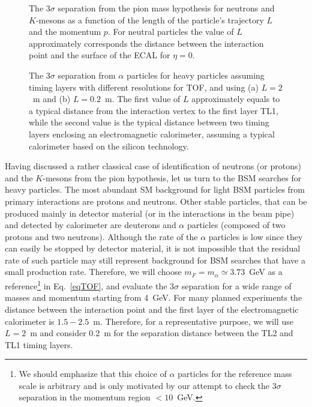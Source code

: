 \begin{figure}
\begin{center}
\end{center}
\caption{
The $3\sigma$ separation from the pion mass hypothesis for neutrons and $K$-mesons as a function of the length of the particle's trajectory  $L$ and the momentum $p$.
For neutral particles the value of $L$ approximately corresponds the distance between the interaction point and the surface of the ECAL for $\eta=0$. 
}
\label{fig:singleparticles}
\end{figure}


\begin{figure}
\begin{center}
\end{center}
\caption{
The $3\sigma$ separation from $\alpha$ particles for heavy particles assuming timing layers with different resolutions for TOF, and using (a) $L=2$~m and (b) $L=0.2$~m.
The first value of $L$ approximately equals to a typical distance
from the interaction vertex to the first layer TL1, while the second value is the typical  distance
between two timing layers enclosing an electromagnetic calorimeter, assuming a typical calorimeter
based on the silicon technology.
}
\label{fig:signgleBSM}
\end{figure}


Having discussed a rather classical case of identification of neutrons (or protons) and the $K$-mesons from the pion hypothesis,
let us turn to the BSM searches for heavy particles.
The most abundant SM  background for light BSM  particles from primary interactions are protons and neutrons.
Other stable particles, that can be produced mainly in 
detector material (or in the interactions in the beam pipe) 
and detected by calorimeter are deuterons and $\alpha$ particles (composed of two protons and two neutrons). 
Although the rate of the $\alpha$ particles is  low since they can easily be stopped by detector material,
it is not impossible that the residual rate of such particle may still represent background for BSM searches that have a small production rate.  
Therefore, we will choose  $m_F=m_{\alpha}\simeq 3.73$~GeV  as a reference\footnote{We should emphasize that this choice of $\alpha$ particles for the reference mass scale  is
arbitrary and is only motivated by our attempt to check the $3\sigma$ separation in the momentum region $<10$~GeV.} in  Eq.~\ref{eqTOF}, and evaluate the
$3\sigma$ separation for a wide range of masses and momentum starting from 4~GeV.
For many planned experiments the distance between the 
interaction point and the first layer of the electromagnetic calorimeter is 
$1.5-2.5$~m. Therefore, for a representative purpose, we will use $L=2$~m and consider 0.2~m for the  separation
distance between the TL2 and TL1 timing layers.

